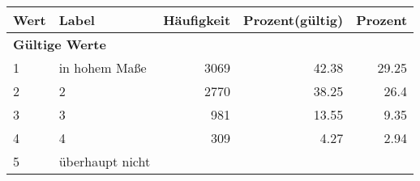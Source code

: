      \begin{longtable}{lXrrr}
     \toprule
     \textbf{Wert} & \textbf{Label} & \textbf{Häufigkeit} & \textbf{Prozent(gültig)} & \textbf{Prozent} \\
     \endhead
     \midrule
     \multicolumn{5}{l}{\textbf{Gültige Werte}}\\

     1 &
     \multicolumn{1}{X}{ in hohem Maße   } &


       \num{3069} &
       \num[round-mode=places,round-precision=2]{42,38} &
         \num[round-mode=places,round-precision=2]{29,25} \\

     2 &
     \multicolumn{1}{X}{ 2   } &


       \num{2770} &
       \num[round-mode=places,round-precision=2]{38,25} &
         \num[round-mode=places,round-precision=2]{26,4} \\

     3 &
     \multicolumn{1}{X}{ 3   } &


       \num{981} &
       \num[round-mode=places,round-precision=2]{13,55} &
         \num[round-mode=places,round-precision=2]{9,35} \\

     4 &
     \multicolumn{1}{X}{ 4   } &


       \num{309} &
       \num[round-mode=places,round-precision=2]{4,27} &
         \num[round-mode=places,round-precision=2]{2,94} \\

     5 &
     \multicolumn{1}{X}{ überhaupt nicht   } &



\end{longtable}
